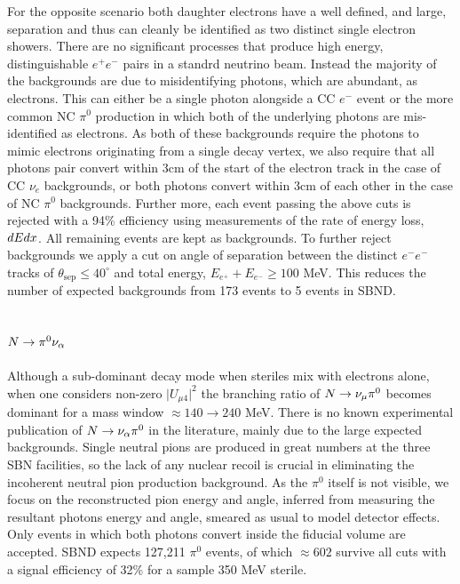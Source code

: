 \documentclass[11pt, a4paper]{article}
\def\ster{\ensuremath N}
\begin{document}
For the opposite scenario both daughter electrons have a well defined, and
large, separation and thus can cleanly be identified as two distinct single
electron showers. There are no significant processes that produce high energy,
distinguishable $e^+e^-$ pairs in a standrd neutrino beam.  Instead the
majority of the backgrounds are due to misidentifying photons, which are
abundant, as electrons. This can either be a single photon alongside a CC $e^-$
event or the more common NC $\pi^0$ production in which both of the underlying
photons are mis-identified as electrons. As both of these backgrounds require
the photons to mimic electrons originating from a single decay vertex, we also
require that all photons pair convert within 3cm of the start of the electron
track in the case of CC $\nu_e$ backgrounds, or both photons convert within 3cm
of each other in the case of NC $\pi^0$ backgrounds. Further more, each event
passing the above cuts is rejected with a 94\% efficiency using measurements of
the rate of energy loss, $dE\/dx$. All remaining events are kept as
backgrounds. To further reject backgrounds we apply a cut on angle of
separation between the distinct $e^-e^-$ tracks of $\theta_\text{sep}\leq 40
^\circ$ and total energy, $E_{e^+}+E_{e^-} \geq 100$ MeV. This reduces the
number of expected backgrounds from 173 events to 5 events in SBND. 

\subsection{$\ster\rightarrow \pi^0 \nu_\alpha$}

Although a sub-dominant decay mode when steriles mix with electrons alone, when
one considers non-zero $\vert U_{\mu4}\vert^2$ the branching ratio of $\ster
\rightarrow \nu_\mu \pi^0$ becomes dominant for a mass window $\approx 140
\rightarrow 240$ MeV. There is no known experimental publication of $\ster
\rightarrow \nu_\alpha \pi^0$ in the literature, mainly due to the large
expected backgrounds. Single neutral pions are produced in great numbers at the
three SBN facilities, so the lack of any nuclear recoil is crucial in
eliminating the incoherent neutral pion production background. As the $\pi^0$
itself is not visible, we focus on the reconstructed pion energy and angle,
inferred from measuring the resultant photons energy and angle, smeared as
usual to model detector effects. Only events in which both photons convert
inside the fiducial volume are accepted. SBND expects 127,211 $\pi^0$ events,
of which $\approx 602$ survive all cuts with a signal efficiency of 32\% for a
sample 350 MeV sterile. \\ 
\end{document}
